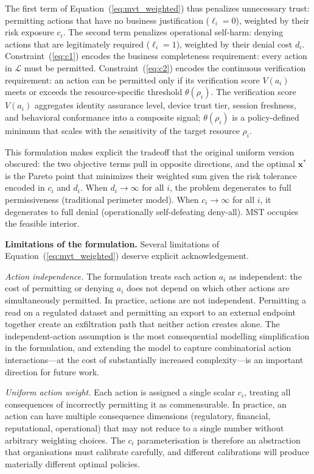 \documentclass[unnumsec,webpdf,contemporary,large]{oup-authoring-template}
\theoremstyle{thmstyleone}
\theoremstyle{thmstyletwo}
\theoremstyle{thmstylethree}
\begin{document}
\begin{appendices}
The first term of Equation~(\ref{eq:mvt_weighted}) thus penalizes unnecessary trust:
permitting actions that have no business justification ($\ell_i = 0$), weighted by
their risk exposure $c_i$. The second term penalizes operational self-harm: denying
actions that are legitimately required ($\ell_i = 1$), weighted by their denial cost
$d_i$. Constraint~(\ref{eq:c1}) encodes the business completeness requirement: every
action in $\mathcal{L}$ must be permitted. Constraint~(\ref{eq:c2}) encodes the
continuous verification requirement: an action can be permitted only if its
verification score $V(a_i)$ meets or exceeds the resource-specific threshold
$\theta(\rho_i)$. The verification score $V(a_i)$ aggregates identity assurance level,
device trust tier, session freshness, and behavioral conformance into a composite
signal; $\theta(\rho_i)$ is a policy-defined minimum that scales with the sensitivity
of the target resource $\rho_i$.

This formulation makes explicit the tradeoff that the original uniform version
obscured: the two objective terms pull in opposite directions, and the optimal
$\mathbf{x}^*$ is the Pareto point that minimizes their weighted sum given the
risk tolerance encoded in $c_i$ and $d_i$. When $d_i \to \infty$ for all $i$, the
problem degenerates to full permissiveness (traditional perimeter model). When
$c_i \to \infty$ for all $i$, it degenerates to full denial (operationally
self-defeating deny-all). MST occupies the feasible interior.

\textbf{Limitations of the formulation.}
Several limitations of Equation~(\ref{eq:mvt_weighted}) deserve explicit
acknowledgement.

\textit{Action independence.} The formulation treats each action $a_i$ as
independent: the cost of permitting or denying $a_i$ does not depend on which other
actions are simultaneously permitted. In practice, actions are not independent.
Permitting a read on a regulated dataset and permitting an export to an external
endpoint together create an exfiltration path that neither action creates alone.
The independent-action assumption is the most consequential modelling simplification
in the formulation, and extending the model to capture combinatorial action
interactions---at the cost of substantially increased complexity---is an important
direction for future work.

\textit{Uniform action weight.} Each action is assigned a single scalar $c_i$,
treating all consequences of incorrectly permitting it as commensurable. In
practice, an action can have multiple consequence dimensions (regulatory, financial,
reputational, operational) that may not reduce to a single number without arbitrary
weighting choices. The $c_i$ parameterisation is therefore an abstraction that
organisations must calibrate carefully, and different calibrations will produce
materially different optimal policies.


\end{appendices}
\end{document}
